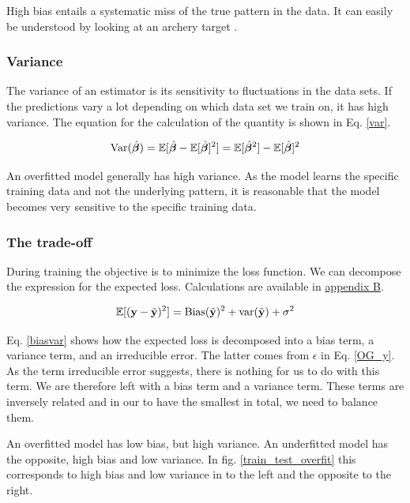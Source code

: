 High bias entails a systematic miss of the true pattern in the data. It can easily be understood by looking at an archery target . 

\subsubsection{Variance}

The variance of an estimator is its sensitivity to fluctuations in the data sets. If the predictions vary a lot depending on which data set we train on, it has high variance. The equation for the calculation of the quantity is shown in Eq. \ref{var}. 

\begin{equation}\label{var}
    \text{Var}(\hat{\boldsymbol{\beta}}) = \mathbb{E}[\hat{\boldsymbol{\beta}}-\mathbb{E}[\hat{\boldsymbol{\beta}}]^2] = \mathbb{E}[\hat{\boldsymbol{\beta}}^2] - \mathbb{E}[\hat{\boldsymbol{\beta}}]^2
\end{equation}

An overfitted model generally has high variance.  As the model learns the specific training data and not the underlying pattern, it is reasonable that the model becomes very sensitive to the specific training data. 

\subsubsection{The trade-off}


During training the objective is to minimize the loss function.  We can decompose the expression for the expected loss. Calculations are available in \hyperref[appendixB]{appendix B}.

\begin{equation}\label{biasvar}
    \mathbb{E}[(\mathbf{y} - \Tilde{\mathbf{y}})^2] = \text{Bias}(\Tilde{\mathbf{y}})^2 + \text{var}(\Tilde{\mathbf{y}}) + \sigma^2
\end{equation}

Eq. \ref{biasvar} shows how the expected loss is decomposed into a bias term, a variance term, and an irreducible error. The latter comes from $\epsilon$ in Eq. \ref{OG_y}. As the term irreducible error suggests, there is nothing for us to do with this term. We are therefore left with a bias term and a variance term. These terms are inversely related and in our to have the smallest  in total, we need to balance them. 

An overfitted model has low bias, but high variance. An underfitted model has the opposite, high bias and low variance. In fig. \ref{train_test_overfit} this corresponds to high bias and low variance in to the left and the opposite to the right. 


